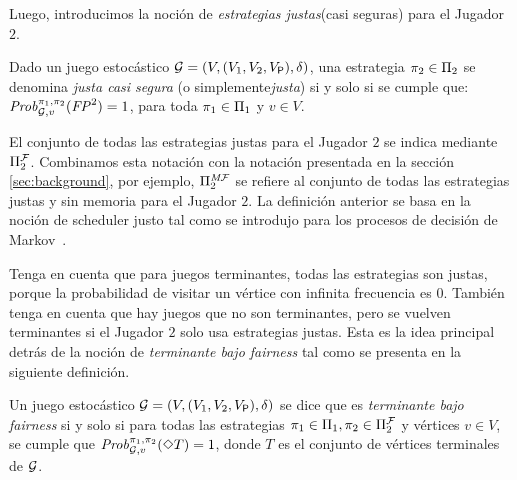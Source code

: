 	
	Luego, introducimos la noción de \emph{estrategias justas}(casi seguras) para el Jugador $2$.
\begin{definition} Dado un juego estocástico $\mathcal{G} = (V, (V_1, V_2, V_{\mathsf{P}}), \delta)$,
una estrategia $\pi_{2} \in \Pi_{2}$ se denomina \emph{justa casi segura} (o simplemente\emph{justa}) si y solo si se cumple que:
$\mathit{Prob}^{\pi_{1}, \pi_{2}}_{\mathcal{G},v}(\mathit{FP}^2) = 1$,
para toda $\pi_{1} \in \Pi_{1}$ y $v \in V$. 
\end{definition}
%
El conjunto de todas las estrategias justas para el Jugador $2$ se indica mediante $\Pi^{\mathcal{F}}_{2}$. Combinamos esta notación con la notación presentada en la sección \ref{sec:background}, por ejemplo, $\Pi^{\textit{M}\mathcal{F}}_{2}$ se refiere al conjunto de todas las estrategias justas y sin memoria para el Jugador $2$.
%
La definición anterior se basa en la noción de scheduler justo tal como se introdujo para los procesos de decisión de Markov~\cite{DBLP:journals/dc/BaierK98,BaierK08}.

Tenga en cuenta que para juegos terminantes, todas las estrategias son justas, porque la probabilidad de visitar un vértice con infinita frecuencia es $0$.
%
También tenga en cuenta que hay juegos que no son terminantes, pero se vuelven terminantes si el Jugador $2$ solo usa estrategias justas. Esta es la idea principal detrás de la noción de \emph{terminante bajo fairness} tal como se presenta en la siguiente definición.

	
\begin{definition}\label{def:stopping-under-fairness}
  Un juego estocástico $\mathcal{G} = (V, (V_1, V_2, V_{\mathsf{P}}), \delta)$ se dice que es \emph{terminante bajo fairness} si y solo si para todas las estrategias $\pi_{1} \in \Pi_{1}, \pi_{2} \in \Pi^{\mathcal{F}}_{2}$ y vértices $v \in V$, se cumple que
  $\mathit{Prob}^{\pi_{1}, \pi_{2}}_{\mathcal{G},v}(\Diamond T)=1$,  donde $T$ es el conjunto de vértices terminales de $\mathcal{G}$. 
\end{definition}


